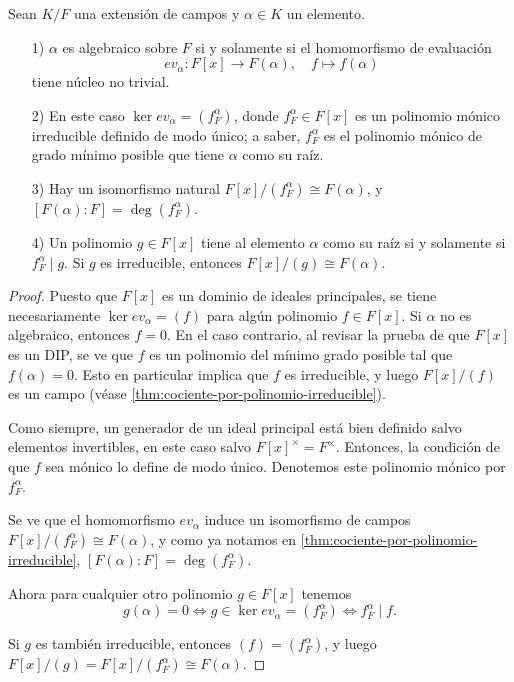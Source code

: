 \begin{teorema}
  \label{thm:polinomio-minimo}
  Sean $K/F$ una extensión de campos y $\alpha \in K$ un elemento.

  \begin{enumerate}
  \item[1)] $\alpha$ es algebraico sobre $F$ si y solamente si el homomorfismo
    de evaluación
    $$ev_\alpha\colon F [x] \to F (\alpha), \quad f \mapsto f (\alpha)$$
    tiene núcleo no trivial.

  \item[2)] En este caso $\ker ev_\alpha = (f^\alpha_F)$, donde
    $f^\alpha_F \in F [x]$ es un polinomio mónico irreducible definido de modo
    único; a saber, $f^\alpha_F$ es el polinomio mónico de grado mínimo posible
    que tiene $\alpha$ como su raíz.

  \item[3)] Hay un isomorfismo natural $F [x] / (f^\alpha_F) \cong F (\alpha)$,
    y $[F (\alpha) : F] = \deg (f^\alpha_F)$.

  \item[4)] Un polinomio $g \in F [x]$ tiene al elemento $\alpha$ como su raíz
    si y solamente si $f^\alpha_F \mid g$. Si $g$ es irreducible, entonces
    $F [x] / (g) \cong F (\alpha)$.
  \end{enumerate}

  \begin{proof}
    Puesto que $F [x]$ es un dominio de ideales principales, se tiene
    necesariamente $\ker ev_\alpha = (f)$ para algún polinomio $f \in F [x]$.
    Si $\alpha$ no es algebraico, entonces $f = 0$. En el caso contrario,
    al revisar la prueba de que $F [x]$ es un DIP, se ve que $f$ es un polinomio
    del mínimo grado posible tal que $f (\alpha) = 0$. Esto en particular
    implica que $f$ es irreducible, y luego $F [x]/(f)$ es un campo
    (véase \ref{thm:cociente-por-polinomio-irreducible}).

    Como siempre, un generador de un ideal principal está bien definido salvo
    elementos invertibles, en este caso salvo $F [x]^\times = F^\times$.
    Entonces, la condición de que $f$ sea mónico lo define de modo
    único. Denotemos este polinomio mónico por $f^\alpha_F$.

    Se ve que el homomorfismo $ev_\alpha$ induce un isomorfismo de campos
    $F [x] / (f^\alpha_F) \cong F (\alpha)$, y como ya notamos en
    \ref{thm:cociente-por-polinomio-irreducible},
    $[F (\alpha) : F] = \deg (f^\alpha_F)$.

    Ahora para cualquier otro polinomio $g \in F[x]$ tenemos
    \[ g (\alpha) = 0 \iff g \in \ker ev_\alpha = (f^\alpha_F) \iff f^\alpha_F \mid f. \]

    Si $g$ es también irreducible, entonces $(f) = (f^\alpha_F)$, y luego
    $F [x] / (g) = F [x] / (f^\alpha_F) \cong F (\alpha)$.
  \end{proof}
\end{teorema}


